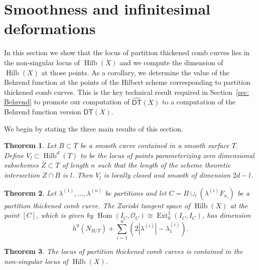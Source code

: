 \documentclass[12pt]{amsart}
\newtheorem{theorem}{Theorem}%
\theoremstyle{definition}
\renewcommand{\O}{\mathcal{O}}
\newcommand{\Hom}{\operatorname{Hom}}
\newcommand{\Ext}{\operatorname{Ext}}
\newcommand{\Hilb}{\operatorname{Hilb}}
\newcommand{\DT}{\mathsf{DT}}
\newcommand{\DThat}{\widehat{\DT}}
\newcommand{\presectionspace}{\vspace{0.2cm}} %
\begin{document}
\presectionspace
\section{Smoothness and infinitesimal deformations}\label{sec: smoothness and deformations}


In this section we show that the locus of partition thickened comb
curves lies in the non-singular locus of $\Hilb (X)$ and we compute
the dimension of $\Hilb (X)$ at those points. As a corollary, we
determine the value of the Behrend function at the points of the
Hilbert scheme corresponding to partition thickened comb curves. This
is the key technical result required in Section~\ref{sec: Behrend} to
promote our computation of $\DThat (X)$ to a computation of the
Behrend function version $\DT (X)$.


We begin by stating the three main results of this section.

\begin{theorem}\label{thm: strata of Hilb(C^2) with fixed intersection
is smooth} Let $B\subset T$ be a smooth curve contained in a smooth
surface $T$. Define $V_{l}\subset \Hilb^{d}(T)$ to be the locus of
points parameterizing zero dimensional subschemes $Z\subset T$ of length
$n$ such that the length of the scheme theoretic intersection $Z\cap
B$ is $l$. Then $V_{l}$ is locally closed and smooth of dimension
$2d-l$.
\end{theorem}

\begin{theorem}\label{thm: Ext computation}
Let $\lambda^{(1)},\dotsc ,\lambda^{(n)}$ be partitions and let
$C=B\cup_{i}\left(\lambda^{(i)}F_{x_{i}} \right)$ be a partition
thickened comb curve. The Zariski tangent space of $\Hilb (X)$ at
the point $[C]$, which is given by $\Hom (I_{C},\O_{C})\cong
\Ext^{1}_{0}(I_{C},I_{C})$, has dimension
\[
h^{0}(N_{B/T}) + \sum_{i=1}^{n}\left(2|\lambda^{(i)}| - \lambda_{1}^{(i)} \right).
\]
\end{theorem}

\begin{theorem}\label{thm: locus of comb curves is smooth}
The locus of partition thickened comb curves is contained in the
non-singular locus of $\Hilb (X)$.
\end{theorem}
\end{document}
